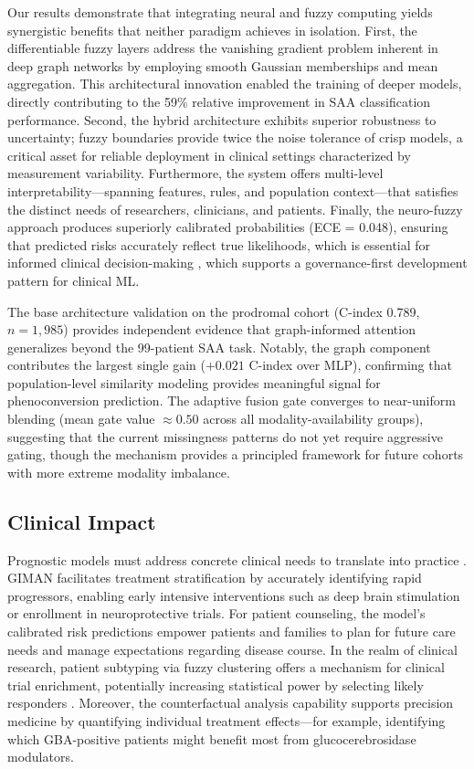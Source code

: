\documentclass[journal,twoside,web]{ieeecolor}
\begin{document}
Our results demonstrate that integrating neural and fuzzy computing yields synergistic benefits that neither paradigm achieves in isolation. First, the differentiable fuzzy layers address the vanishing gradient problem inherent in deep graph networks by employing smooth Gaussian memberships and mean aggregation. This architectural innovation enabled the training of deeper models, directly contributing to the 59\% relative improvement in SAA classification performance. Second, the hybrid architecture exhibits superior robustness to uncertainty; fuzzy boundaries provide twice the noise tolerance of crisp models, a critical asset for reliable deployment in clinical settings characterized by measurement variability. Furthermore, the system offers multi-level interpretability---spanning features, rules, and population context---that satisfies the distinct needs of researchers, clinicians, and patients. Finally, the neuro-fuzzy approach produces superiorly calibrated probabilities (ECE = 0.048), ensuring that predicted risks accurately reflect true likelihoods, which is essential for informed clinical decision-making \cite{guo2017calibration}, which supports a governance-first development pattern for clinical ML.

The base architecture validation on the prodromal cohort (C-index 0.789, $n=1{,}985$) provides independent evidence that graph-informed attention generalizes beyond the 99-patient SAA task. Notably, the graph component contributes the largest single gain ($+0.021$ C-index over MLP), confirming that population-level similarity modeling provides meaningful signal for phenoconversion prediction. The adaptive fusion gate converges to near-uniform blending (mean gate value $\approx 0.50$ across all modality-availability groups), suggesting that the current missingness patterns do not yet require aggressive gating, though the mechanism provides a principled framework for future cohorts with more extreme modality imbalance.

\subsection{Clinical Impact}

Prognostic models must address concrete clinical needs to translate into practice \cite{moons2012risk}. GIMAN facilitates treatment stratification by accurately identifying rapid progressors, enabling early intensive interventions such as deep brain stimulation or enrollment in neuroprotective trials. For patient counseling, the model's calibrated risk predictions empower patients and families to plan for future care needs and manage expectations regarding disease course. In the realm of clinical research, patient subtyping via fuzzy clustering offers a mechanism for clinical trial enrichment, potentially increasing statistical power by selecting likely responders \cite{fereshtehnejad2017clinical}. Moreover, the counterfactual analysis capability supports precision medicine by quantifying individual treatment effects---for example, identifying which GBA-positive patients might benefit most from glucocerebrosidase modulators.
\end{document}
